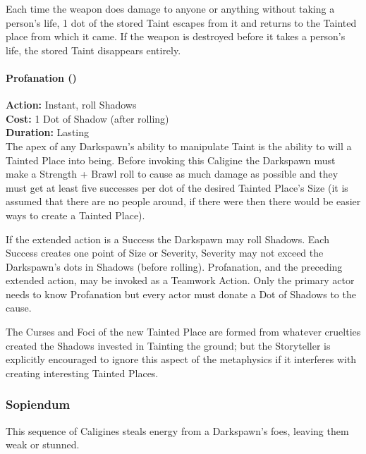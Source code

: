 Each time the weapon does damage to anyone or anything without taking a person's life, 1 dot of the stored Taint escapes from it and returns to the Tainted place from which it came. If the weapon is destroyed before it takes a person's life, the stored Taint disappears entirely.\\ 

\paragraph*{Profanation (\textbullet\textbullet\textbullet\textbullet\textbullet)} 

\noindent \textbf{Action:} Instant, roll Shadows\\

\noindent \textbf{Cost:} 1 Dot of Shadow (after rolling)\\

\noindent \textbf{Duration:} Lasting \\

\noindent  The apex of any Darkspawn's ability to manipulate Taint is the ability to will a Tainted Place into being. Before invoking this Caligine the Darkspawn must make a Strength + Brawl roll to cause as much damage as possible and they must get at least five successes per dot of the desired Tainted Place's Size (it is assumed that there are no people around, if there were then there would be easier ways to create a Tainted Place).

If the extended action is a Success the Darkspawn may roll Shadows. Each Success creates one point of Size or Severity, Severity may not exceed the Darkspawn's dots in Shadows (before rolling). Profanation, and the preceding extended action, may be invoked as a Teamwork Action. Only the primary actor needs to know Profanation but every actor must donate a Dot of Shadows to the cause.

The Curses and Foci of the new Tainted Place are formed from whatever cruelties created the Shadows invested in Tainting the ground; but the Storyteller is explicitly encouraged to ignore this aspect of the metaphysics if it interferes with creating interesting Tainted Places.

\subsubsection*{Sopiendum}

This sequence of Caligines steals energy from a Darkspawn's foes, leaving them weak or stunned. \\

